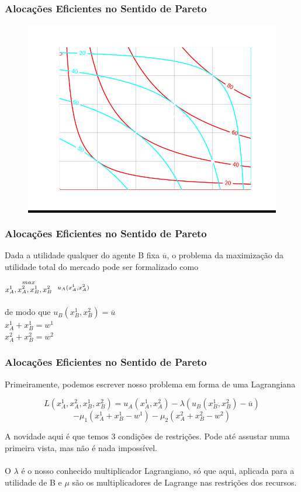 \documentclass{beamer}[10]
\begin{document}
\begin{frame}
	\frametitle{Alocações Eficientes no Sentido de Pareto}


	\begin{figure}[H]
		\centering
		\colorbox{black}{\includegraphics[scale=0.6]{cap32_3-caixa_edgeworth_1.png}}
	\end{figure}		

\end{frame}

\begin{frame}
	\frametitle{Alocações Eficientes no Sentido de Pareto}

	Dada a utilidade qualquer do agente B fixa $\overline{u}$, o problema da maximização da utilidade total do mercado pode ser formalizado como

	\begin{center}
	\LARGE $\stackrel{max}{\text{\small $x_A^1,x_A^2,x_B^1,x_ B^2$}} \ \ \stackrel{u_A(x_A^1,x_A^2)}{\ }$
	\\~\\
	\normalsize de modo que $u_B(x_B^1,x_B^2) = \overline{u}$ \\
	$x_A^1 + x_B^1 = w^1$ \\
	$x_A^2 + x_B^2 = w^2$
	\end{center}
	
\end{frame}

\begin{frame}
	\frametitle{Alocações Eficientes no Sentido de Pareto}

	Primeiramente, podemos escrever nosso problema em forma de uma Lagrangiana 

	$$L(x_A^1,x_A^2,x_B^1,x_B^2) = u_A(x_A^1,x_A^2) - \lambda(u_B(x_B^1,x_B^2) - \overline{u}) $$ 
	$$ - \mu_1(x_A^1 + x_B^1 - w^1) - \mu_2(x_A^2 + x_B^2 - w^2)$$

	A novidade aqui é que temos 3 condições de restrições. Pode até assustar numa primeira vista, mas não é nada impossível.
	\\~\\
	O $\lambda$ é o nosso conhecido multiplicador Lagrangiano, só que aqui, aplicada para a utilidade de B e $\mu$ são os multiplicadores de Lagrange nas restrições dos recursos.

\end{frame}
\end{document}
